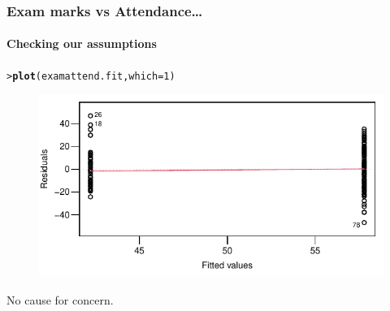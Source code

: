 \documentclass{beamer}\usepackage[]{graphicx}\usepackage[]{xcolor}
\makeatletter
\newcommand{\hlnum}[1]{\textcolor[rgb]{0.686,0.059,0.569}{#1}}%
\newcommand{\hlstd}[1]{\textcolor[rgb]{0.345,0.345,0.345}{#1}}%
\newcommand{\hlkwc}[1]{\textcolor[rgb]{0.333,0.667,0.333}{#1}}%
\newcommand{\hlkwd}[1]{\textcolor[rgb]{0.737,0.353,0.396}{\textbf{#1}}}%
\newenvironment{kframe}{%
 \def\at@end@of@kframe{}%
 \ifinner\ifhmode%
  \def\at@end@of@kframe{\end{minipage}}%
  \begin{minipage}{\columnwidth}%
 \fi\fi%
 \def\FrameCommand##1{\hskip\@totalleftmargin \hskip-\fboxsep
 \colorbox{shadecolor}{##1}\hskip-\fboxsep
     \hskip-\linewidth \hskip-\@totalleftmargin \hskip\columnwidth}%
 \MakeFramed {\advance\hsize-\width
   \@totalleftmargin\z@ \linewidth\hsize
   \@setminipage}}%
 {\par\unskip\endMakeFramed%
 \at@end@of@kframe}
\newenvironment{knitrout}{}{} %
\makeatother
\begin{document}
\begin{frame}[fragile]
\frametitle{Exam marks vs Attendance\ldots}
\framesubtitle{Checking our assumptions}

\begin{knitrout}\scriptsize
{}\color{fgcolor}\begin{kframe}
\begin{alltt}
\hlstd{> }\hlkwd{plot}\hlstd{(examattend.fit,}\hlkwc{which}\hlstd{=}\hlnum{1}\hlstd{)}
\end{alltt}
\end{kframe}
\end{knitrout}



\begin{figure}
  \centering
  \includegraphics{figure/RC-H05-016}
\end{figure}
No cause for concern. 
\end{frame}
\end{document}
